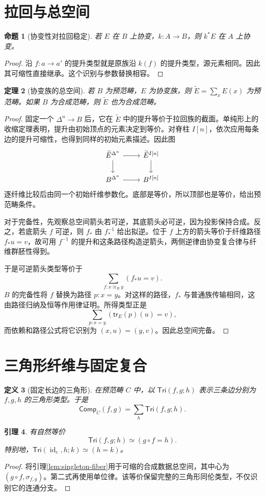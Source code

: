 \documentclass[12pt,oneside,openany,fontset=none]{ctexbook}
\theoremstyle{cn}
\newtheorem{definition}{定义}[chapter]
\newtheorem{lemma}[definition]{引理}
\newtheorem{proposition}[definition]{命题}
\newtheorem{theorem}[definition]{定理}
\numberwithin{equation}{chapter}
\newcommand{\id}{\operatorname{id}}
\newcommand{\tr}{\mathsf{tr}}
\newcommand{\Comp}{\mathsf{Comp}}
\begin{document}
\section{拉回与总空间}
\begin{proposition}[协变性对拉回稳定]
若 $E$ 在 $B$ 上协变，$k:A\to B$，则 $k^*E$ 在 $A$ 上协变。
\end{proposition}
\begin{proof}
沿 $f:a\to a'$ 的提升类型就是原族沿 $k(f)$ 的提升类型，源元素相同。因此其可缩性直接继承。这个识别与参数替换相容。
\end{proof}
\begin{theorem}[协变族的总空间]
若 $B$ 为预范畴，$E$ 为协变族，则 $\widetilde E=\sum_xE(x)$ 为预范畴。如果 $B$ 为合成范畴，则 $\widetilde E$ 也为合成范畴。
\end{theorem}
\begin{proof}
固定一个 $\Delta^n\to B$ 后，它在 $\widetilde E$ 中的提升等价于拉回族的截面。单纯形上的收缩定理表明，提升由初始顶点的元素决定到等价。对脊柱 $I[n]$，依次应用每条边的提升可缩性，也得到同样的初始元素描述。因此图
\[
\begin{tikzcd}
\widetilde E^{\Delta^n}\ar[r]\ar[d]&\widetilde E^{I[n]}\ar[d]\\
B^{\Delta^n}\ar[r]&B^{I[n]}
\end{tikzcd}
\]
逐纤维比较后由同一个初始纤维参数化。底部是等价，所以顶部也是等价，给出预范畴条件。

对于完备性，先观察总空间箭头若可逆，其底箭头必可逆，因为投影保持合成。反之，若底箭头 $f$ 可逆，则 $f_*$ 由 $f^{-1}_*$ 给出拟逆。位于 $f$ 上方的箭头等价于纤维路径 $f_*u=v$，故可用 $f^{-1}$ 的提升和这条路径构造逆箭头，两侧逆律由协变复合律与纤维群胚性得到。

于是可逆箭头类型等价于
\[
\sum_{f:x\cong_B y}(f_*u=v).
\]
$B$ 的完备性将 $f$ 替换为路径 $p:x=y$。对这样的路径，$f_*$ 与普通族传输相同，这由路径归纳及恒等作用律证明。所得类型正是
\[
\sum_{p:x=y}(\tr_E(p)(u)=v),
\]
而依赖和路径公式将它识别为 $(x,u)=(y,v)$。因此总空间完备。
\end{proof}

\section{三角形纤维与固定复合}
\begin{definition}[固定长边的三角形]
在预范畴 $C$ 中，以 $\mathsf{Tri}(f,g;h)$ 表示三条边分别为 $f,g,h$ 的三角形类型。于是
\[
\Comp_C(f,g)=\sum_h\mathsf{Tri}(f,g;h).
\]
\end{definition}
\begin{lemma}\label{lem:triangle-path}
有自然等价
\[
\mathsf{Tri}(f,g;h)\simeq(g\circ f=h).
\]
特别地，$\mathsf{Tri}(\id_c,h;k)\simeq(h=k)$。
\end{lemma}
\begin{proof}
将引理\ref{lem:singleton-fiber}用于可缩的合成数据总空间，其中心为 $(g\circ f,\sigma_{f,g})$。第二式再使用单位律。该等价保留完整的三角形同伦类型，不仅识别它的连通分支。
\end{proof}
\end{document}
